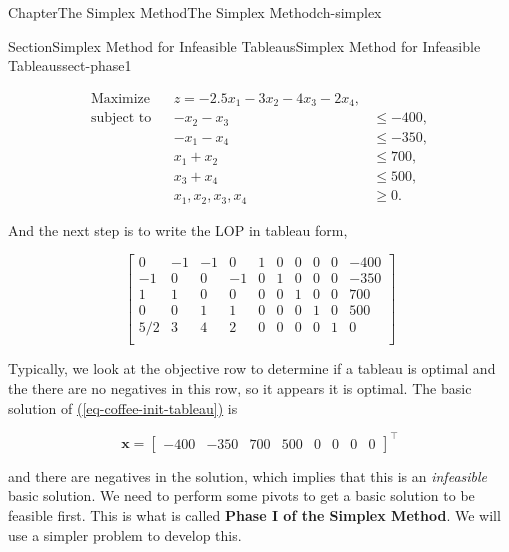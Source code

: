 \documentclass[oneside,10pt,]{book}
\newcommand{\xreffont}{\relax}
\newcommand{\terminology}[1]{\textbf{#1}}
\numberwithin{equation}{section}
\newcommand{\amp}{&}
\begin{document}
\begin{chapterptx}{Chapter}{The Simplex Method}{}{The Simplex Method}{}{}{ch-simplex}
\begin{sectionptx}{Section}{Simplex Method for Infeasible Tableaus}{}{Simplex Method for Infeasible Tableaus}{}{}{sect-phase1}
\begin{introduction}{}
\par
%
\begin{equation}
\begin{aligned}\text{Maximize} \amp \amp z  = -2.5 x_1 - 3 x_2 - 4 x_3 - 2 x_4, \amp \\ \text{subject to} \amp \amp -x_2 - x_3 \amp \leq -400,\\ \amp \amp -x_1 - x_4 \amp \leq -350, \\ \amp \amp x_1 + x_2 \amp \leq 700, \\ \amp \amp x_3 + x_4 \amp \leq 500, \\ \amp \amp x_1, x_2, x_3, x_4 \amp \geq 0.
\end{aligned}\label{eq-coffee-std-form}
\end{equation}
%
\par
And the next step is to write the LOP in tableau form,%
\par
%
\begin{equation}
\left[\begin{array}{rrrr|rrrrr|r} 0 \amp -1 \amp -1 \amp 0 \amp 1 \amp 0 \amp 0 \amp 0 \amp 0 \amp -400\\ -1 \amp 0 \amp 0 \amp -1 \amp 0 \amp 1 \amp 0 \amp 0 \amp 0 \amp -350\\ 1 \amp 1 \amp 0 \amp 0 \amp 0 \amp 0 \amp 1 \amp 0 \amp 0 \amp 700\\ 0 \amp 0 \amp 1 \amp 1 \amp 0 \amp 0 \amp 0 \amp 1 \amp 0 \amp 500\\ \hline 5/2 \amp 3 \amp 4 \amp 2 \amp 0 \amp 0 \amp 0 \amp 0 \amp 1 \amp 0\\ \end{array} \right]\label{eq-coffee-init-tableau}
\end{equation}
%
\par
Typically, we look at the objective row to determine if a tableau is optimal and the there are no negatives in this row, so it appears it is optimal. The basic solution of \hyperref[eq-coffee-init-tableau]{({\xreffont\ref{eq-coffee-init-tableau}})} is%
\par
%
\begin{equation*}
\boldsymbol{x} = \left[ \begin{array} {rrrr|rrrrr} -400 \amp -350 \amp 700 \amp 500 \amp 0 \amp 0 \amp 0 \amp 0 \end{array} \right]^{\intercal}
\end{equation*}
%
\par
and there are negatives in the solution, which implies that this is an \emph{infeasible} basic solution. We need to perform some pivots to get a basic solution to be feasible first. This is what is called \terminology{Phase I of the Simplex Method}. We will use a simpler problem to develop this.%

\end{introduction}
\end{sectionptx}
\end{chapterptx}
\end{document}
